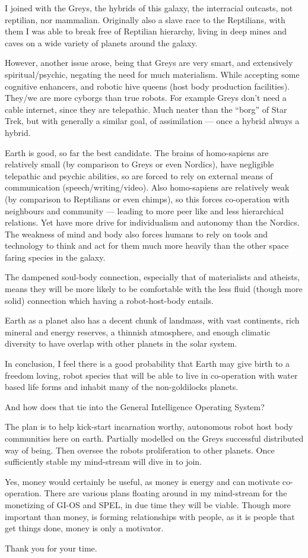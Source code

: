 \documentclass{report}
\begin{document}
I joined with the Greys, the hybrids of this galaxy, the interracial outcasts,
not reptilian, nor mammalian.  Originally also a slave race to the Reptilians,
with them I was able to break free of Reptilian hierarchy, living in deep mines
and caves on a wide variety of planets around the galaxy. 

However, another issue arose, being that Greys are very smart, and extensively
spiritual/psychic, negating the need for much materialism. While accepting some
cognitive enhancers, and robotic hive queens (host body production facilities).
They/we are more cyborgs than true robots.  For example Greys don't need a cable
internet, since they are telepathic. Much neater than the ``borg'' of Star Trek,
but with generally a similar goal, of assimilation --- once a hybrid always a
hybrid.

Earth is good, so far the best candidate. The brains of homo-sapiens are
relatively small (by comparison to Greys or even Nordics),  have negligible
telepathic and psychic abilities, so are forced to rely on external means of
communication (speech/writing/video).  Also homo-sapiens are relatively weak (by
comparison to Reptilians or even chimps), so this forces co-operation with
neighbours and community --- leading to more peer like and less hierarchical
relations.  Yet have more drive for individualism and autonomy than the Nordics.
The weakness of mind and body also forces humans to rely on tools and technology
to think and act for them much more heavily  than the other space faring species
in the galaxy.

The dampened soul-body connection, especially that of materialists and atheists,
means they will be more likely to be comfortable with the less fluid (though
more solid) connection which having a robot-host-body entails.

Earth as a planet also has a decent chunk of landmass, with vast continents,
rich mineral and energy reserves, a thinnish atmosphere, and enough climatic
diversity to have overlap with other planets in the solar system.

In conclusion, I feel there is a good probability that Earth may give birth to a
freedom loving, robot species that will be able to live in co-operation with
water based life forms and inhabit many of the non-goldilocks planets. 

And how does that tie into the General Intelligence Operating System?

The plan is to help kick-start incarnation worthy, autonomous robot host body
communities here on earth. Partially modelled on the Greys successful
distributed way of being. Then oversee the robots proliferation to other
planets.  Once sufficiently stable my mind-stream will dive in to join.

Yes, money would certainly be useful,  as money is energy and can motivate
co-operation. There are various plans floating around in my mind-stream for the
monetizing of GI-OS and SPEL, in due time they will be viable.   Though more
important than money, is forming relationships with people, as it is people that
get things done,  money is only a motivator.

Thank you for your time.
\end{document}
